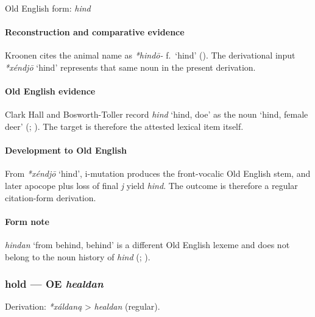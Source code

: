 \documentclass[
  british,
  a4paper,
]{article}
\providecommand{\Recon}[1]{\emph{*#1}}
\begin{document}
Old English form: \emph{hind}

\paragraph{Reconstruction and comparative
evidence}\label{reconstruction-and-comparative-evidence-37}

Kroonen cites the animal name as \emph{*hindō-} f.~`hind'
(). The derivational input
\Recon{xéndjō} `hind' represents that same noun in the present
derivation.

\paragraph{Old English evidence}\label{old-english-evidence-38}

Clark Hall and Bosworth-Toller record {\emph{hind}} `hind, doe' as the
noun `hind, female deer' (;
). The
target is therefore the attested lexical item itself.

\paragraph{Development to Old
English}\label{development-to-old-english-38}

From \Recon{xéndjō} `hind', i-mutation produces the front-vocalic Old
English stem, and later apocope plus loss of final \emph{j} yield
\emph{hind}. The outcome is therefore a regular citation-form
derivation.

\paragraph{Form note}\label{form-note-9}

\emph{hindan} `from behind, behind' is a different Old English lexeme
and does not belong to the noun history of \emph{hind}
(;
).

\subsubsection{\texorpdfstring{hold --- OE
\emph{healdan}}{hold --- OE healdan}}\label{hold-oe-healdan}

Derivation: \emph{*xáldaną} \textgreater{} \emph{healdan} (regular).
\end{document}
